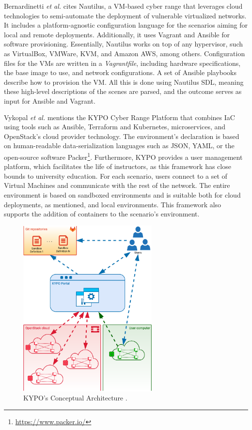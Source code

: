 Bernardinetti \textit{et al.} \cite{nautilus_ref} cites Nautilus, a VM-based cyber range that leverages cloud technologies to semi-automate the deployment of vulnerable virtualized networks. It includes a platform-agnostic configuration language for the scenarios aiming for local and remote deployments. Additionally, it uses Vagrant and Ansible for software provisioning. Essentially, Nautilus works on top of any hypervisor, such as VirtualBox, VMWare, KVM, and Amazon AWS, among others. Configuration files for the VMs are written in a \textit{Vagrantfile}, including hardware specifications, the base image to use, and network configurations. A set of Ansible playbooks describe how to provision the VM. All this is done using Nautilus SDL, meaning these high-level descriptions of the scenes are parsed, and the outcome serves as input for Ansible and Vagrant.

Vykopal \textit{et al.} \cite{kypo_crp_ref} mentions the KYPO Cyber Range Platform that combines IaC using tools such as Ansible, Terraform and Kubernetes, microservices, and OpenStack's cloud provider technology. The environment's declaration is based on human-readable data-serialization languages such as JSON, YAML, or the open-source software Packer\footnote{\url{https://www.packer.io/}}. Furthermore, KYPO provides a user management platform, which facilitates the life of instructors, as this framework has close bounds to university education. For each scenario, users connect to a set of Virtual Machines and communicate with the rest of the network. The entire environment is based on sandboxed environments and is suitable both for cloud deployments, as mentioned, and local environments. This framework also supports the addition of containers to the scenario's environment.

\begin{figure}[H]
    \includegraphics[width=7cm]{figures/KYPO-portal-diagram.png}
    \caption{KYPO's Conceptual Architecture \cite{kypo_arch_ref}.}
    \label{fig:kypo_concept_arch}
\end{figure}

